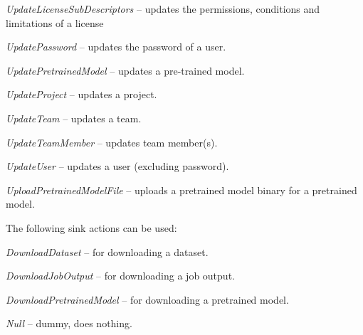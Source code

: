 \documentclass[a4paper]{book}
\begin{document}
\begin{tight_itemize}
  \item \textit{UpdateLicenseSubDescriptors} -- updates the permissions, conditions and limitations of a license
  \item \textit{UpdatePassword} -- updates the password of a user.
  \item \textit{UpdatePretrainedModel} -- updates a pre-trained model.
  \item \textit{UpdateProject} -- updates a project.
  \item \textit{UpdateTeam} -- updates a team.
  \item \textit{UpdateTeamMember} -- updates team member(s).
  \item \textit{UpdateUser} -- updates a user (excluding password).
  \item \textit{UploadPretrainedModelFile} -- uploads a pretrained model binary for a pretrained model.
\end{tight_itemize}
The following sink actions can be used:
\begin{tight_itemize}
  \item \textit{DownloadDataset} -- for downloading a dataset.
  \item \textit{DownloadJobOutput} -- for downloading a job output.
  \item \textit{DownloadPretrainedModel} -- for downloading a pretrained model.
  \item \textit{Null} -- dummy, does nothing.
\end{tight_itemize}
\end{document}
